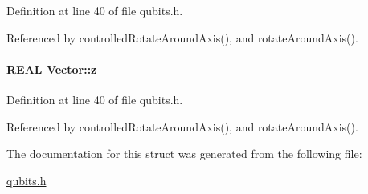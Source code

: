 Definition at line 40 of file qubits.h.

Referenced by controlledRotateAroundAxis(), and rotateAroundAxis().\hypertarget{structVector_ad4e863651be7d6b7e2b28cd7445a0ccf}{
\paragraph[{z}]{\setlength{\rightskip}{0pt plus 5cm}REAL {\bf Vector::z}}\hfill}
\label{structVector_ad4e863651be7d6b7e2b28cd7445a0ccf}


Definition at line 40 of file qubits.h.

Referenced by controlledRotateAroundAxis(), and rotateAroundAxis().

The documentation for this struct was generated from the following file:\begin{DoxyCompactItemize}
\item 
\hyperlink{qubits_8h}{qubits.h}\end{DoxyCompactItemize}
